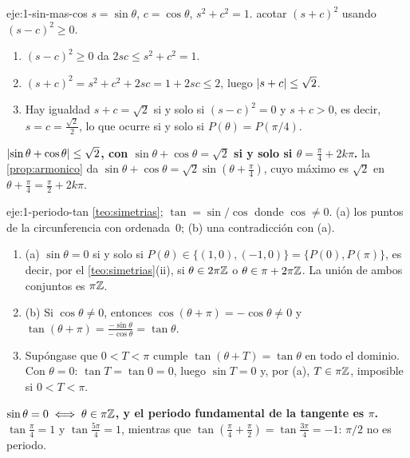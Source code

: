 \begin{solucion}{eje:1-sin-mas-cos}
\datos $s=\sin\theta$, $c=\cos\theta$, $s^{2}+c^{2}=1$.
\planteamiento acotar $(s+c)^{2}$ usando $(s-c)^{2}\ge0$.
\pasos
\begin{enumerate}[label=\arabic*.]
  \item $(s-c)^{2}\ge0$ da $2sc\le s^{2}+c^{2}=1$.
  \item $(s+c)^{2}=s^{2}+c^{2}+2sc=1+2sc\le2$, luego $\lvert s+c\rvert\le\sqrt2$.
  \item Hay igualdad $s+c=\sqrt2$ si y solo si $(s-c)^{2}=0$ y $s+c>0$, es decir, $s=c=\frac{\sqrt2}{2}$, lo que ocurre si y solo si $P(\theta)=P(\pi/4)$.
\end{enumerate}
\resultado \textbf{$\lvert\sin\theta+\cos\theta\rvert\le\sqrt2$, con $\sin\theta+\cos\theta=\sqrt2$ si y solo si $\theta=\frac{\pi}{4}+2k\pi$.}
\comprobacion la \cref{prop:armonico} da $\sin\theta+\cos\theta=\sqrt2\sin(\theta+\frac{\pi}{4})$, cuyo máximo es $\sqrt2$ en $\theta+\frac{\pi}{4}=\frac{\pi}{2}+2k\pi$.
\end{solucion}

\begin{solucion}{eje:1-periodo-tan}
\datos \cref{teo:simetrias}; $\tan=\sin/\cos$ donde $\cos\ne0$.
\planteamiento (a) los puntos de la circunferencia con ordenada~0; (b) una contradicción con (a).
\pasos
\begin{enumerate}[label=\arabic*.]
  \item (a) $\sin\theta=0$ si y solo si $P(\theta)\in\{(1,0),(-1,0)\}=\{P(0),P(\pi)\}$, es decir, por el \cref{teo:simetrias}(ii), si $\theta\in2\pi\mathbb{Z}$ o $\theta\in\pi+2\pi\mathbb{Z}$. La unión de ambos conjuntos es $\pi\mathbb{Z}$.
  \item (b) Si $\cos\theta\ne0$, entonces $\cos(\theta+\pi)=-\cos\theta\ne0$ y $\tan(\theta+\pi)=\frac{-\sin\theta}{-\cos\theta}=\tan\theta$.
  \item Supóngase que $0<T<\pi$ cumple $\tan(\theta+T)=\tan\theta$ en todo el dominio. Con $\theta=0$: $\tan T=\tan0=0$, luego $\sin T=0$ y, por (a), $T\in\pi\mathbb{Z}$, imposible si $0<T<\pi$.
\end{enumerate}
\resultado \textbf{$\sin\theta=0\iff\theta\in\pi\mathbb{Z}$, y el periodo fundamental de la tangente es $\pi$.}
\comprobacion $\tan\frac{\pi}{4}=1$ y $\tan\frac{5\pi}{4}=1$, mientras que $\tan(\frac{\pi}{4}+\frac{\pi}{2})=\tan\frac{3\pi}{4}=-1$: $\pi/2$ no es periodo.
\end{solucion}


